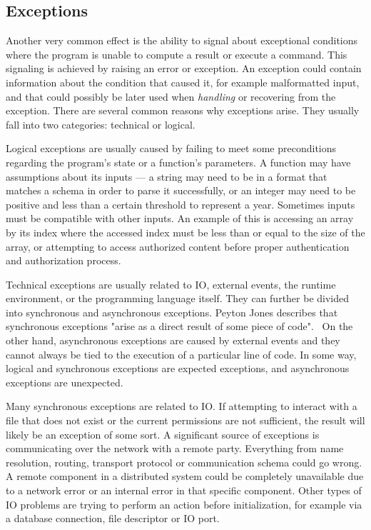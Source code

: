 \subsection{Exceptions} \label{effects:exceptions}
Another very common effect is the ability to signal about exceptional conditions where the program is unable to compute a result or execute a command. This signaling is achieved by raising an error or exception. An exception could contain information about the condition that caused it, for example malformatted input, and that could possibly be later used when \textit{handling} or recovering from the exception. There are several common reasons why exceptions arise. They usually fall into two categories: technical or logical.~\cite{imprecise-exceptions}

Logical exceptions are usually caused by failing to meet some preconditions regarding the program's state or a function's parameters. A function may have assumptions about its inputs --- a string may need to be in a format that matches a schema in order to parse it successfully, or an integer may need to be positive and less than a certain threshold to represent a year. Sometimes inputs must be compatible with other inputs. An example of this is accessing an array by its index where the accessed index must be less than or equal to the size of the array, or attempting to access authorized content before proper authentication and authorization process.

Technical exceptions are usually related to IO, external events, the runtime environment, or the programming language itself. They can further be divided into synchronous and asynchronous exceptions. Peyton Jones describes that synchronous exceptions "arise as a direct result of some piece of code".~\cite{akward-squad}  On the other hand, asynchronous exceptions are caused by external events and they cannot always be tied to the execution of a particular line of code. In some way, logical and synchronous exceptions are expected exceptions, and asynchronous exceptions are unexpected.

Many synchronous exceptions are related to IO. If attempting to interact with a file that does not exist or the current permissions are not sufficient, the result will likely be an exception of some sort. A significant source of exceptions is communicating over the network with a remote party. Everything from name resolution, routing, transport protocol or communication schema could go wrong. A remote component in a distributed system could be completely unavailable due to a network error or an internal error in that specific component. Other types of IO problems are trying to perform an action before initialization, for example via a database connection, file descriptor or IO port.

